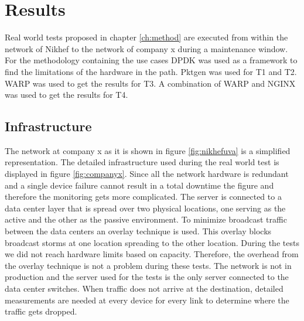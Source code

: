\chapter{Results}\label{ch:results}
Real world tests proposed in chapter \ref{ch:method} are executed from within the network of Nikhef to the network of company x during a maintenance window.
For the methodology containing the use cases DPDK was used as a framework to find the limitations of the hardware in the path. 
Pktgen was used for T1 and T2. WARP was used to get the results for T3.
A combination of WARP and NGINX was used to get the results for T4. 


\section{Infrastructure}
The network at company x as it is shown in figure \ref{fig:nikhefuva} is a simplified representation.
The detailed infrastructure used during the real world test is displayed in figure \ref{fig:companyx}. 
Since all the network hardware is redundant and a single device failure cannot result in a total downtime the figure and therefore the monitoring gets more complicated.
The server is connected to a data center layer that is spread over two physical locations, one serving as the active and the other as the passive environment.
To minimize broadcast traffic between the data centers an overlay technique is used. This overlay blocks broadcast storms at one location spreading to the other location.
During the tests we did not reach hardware limits based on capacity. 
Therefore, the overhead from the overlay technique is not a problem during these tests.  
The network is not in production and the server used for the tests is the only server connected to the data center switches.     
When traffic does not arrive at the destination, detailed measurements are needed at every device for every link to determine where the traffic gets dropped.   

